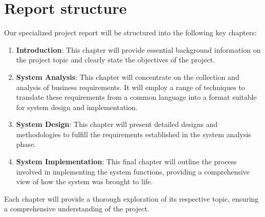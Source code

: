 \section{Report structure}
Our specialized project report will be structured into the following key chapters:
\begin{enumerate}
    \item \textbf{Introduction}: This chapter will provide essential background information on the project topic and clearly state the objectives of the project.
    \item \textbf{System Analysis}: This chapter will concentrate on the collection and analysis of business requirements. It will employ a range of techniques to translate these requirements from a common language into a format suitable for system design and implementation.
    \item \textbf{System Design}: This chapter will present detailed designs and methodologies to fulfill the requirements established in the system analysis phase.
    \item \textbf{System Implementation}: This final chapter will outline the process involved in implementing the system functions, providing a comprehensive view of how the system was brought to life.
\end{enumerate}


Each chapter will provide a thorough exploration of its respective topic, ensuring a comprehensive understanding of the project.
